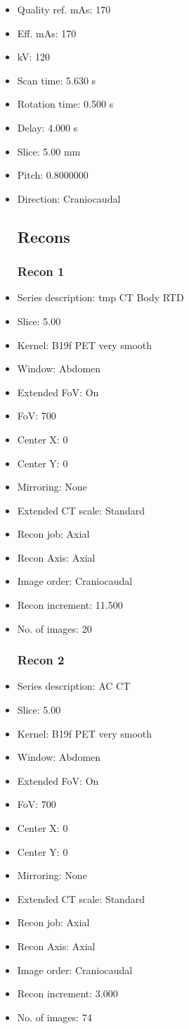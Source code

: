 \documentclass[12pt]{article}
\begin{document}
\begin{itemize}[noitemsep]
\subsection{Scan}
\item Quality ref. mAs: 170\item Eff. mAs: 170\item kV: 120\item Scan time: 5.630 s\item Rotation time: 0.500 s\item Delay: 4.000 s\item Slice: 5.00 mm\item Pitch: 0.8000000\item Direction: Craniocaudal\subsection{Recons}

\subsubsection{Recon 1}
\item Series description: tmp CT Body RTD
\item Slice: 5.00
\item Kernel: B19f PET very smooth
\item Window: Abdomen
\item Extended FoV: On
\item FoV: 700
\item Center X: 0
\item Center Y: 0
\item Mirroring: None
\item Extended CT scale: Standard
\item Recon job: Axial
\item Recon Axis: Axial
\item Image order: Craniocaudal
\item Recon increment: 11.500
\item No. of images: 20
\subsubsection{Recon 2}
\item Series description: AC CT
\item Slice: 5.00
\item Kernel: B19f PET very smooth
\item Window: Abdomen
\item Extended FoV: On
\item FoV: 700
\item Center X: 0
\item Center Y: 0
\item Mirroring: None
\item Extended CT scale: Standard
\item Recon job: Axial
\item Recon Axis: Axial
\item Image order: Craniocaudal
\item Recon increment: 3.000
\item No. of images: 74

\end{itemize}
\end{document}
